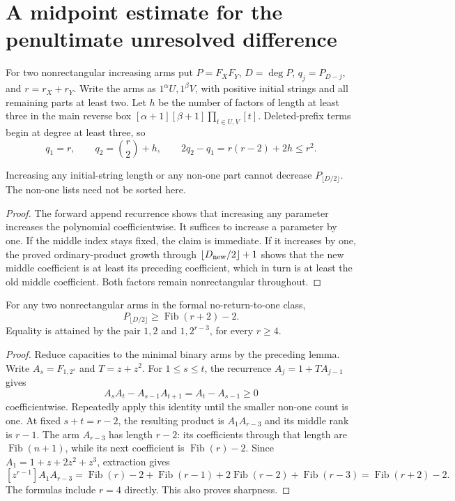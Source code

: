 \section{A midpoint estimate for the penultimate unresolved difference}
For two nonrectangular increasing arms put $P=F_XF_Y$, $D=\deg P$,
$q_j=P_{D-j}$, and $r=r_X+r_Y$. Write the arms as
$1^\alpha U,1^\beta V$, with positive initial strings and all remaining
parts at least two. Let $h$ be the number of factors of length at least
three in the main reverse box
$[\alpha+1][\beta+1]\prod_{t\in U,V}[t]$.
Deleted-prefix terms begin at degree at least three, so
\[
 q_1=r,\qquad q_2=\binom r2+h,
 \qquad 2q_2-q_1=r(r-2)+2h\le r^2.
\]

\begin{lemma}
Increasing any initial-string length or any non-one part cannot decrease
$P_{\lfloor D/2\rfloor}$. The non-one lists need not be sorted here.
\end{lemma}
\begin{proof}
The forward append recurrence shows that increasing any parameter
increases the polynomial coefficientwise. It suffices to increase a
parameter by one. If the middle index stays fixed, the claim is immediate.
If it increases by one, the proved ordinary-product growth through
$\lfloor D_{\rm new}/2\rfloor+1$ shows that the new middle coefficient
is at least its preceding coefficient, which in turn is at least the old
middle coefficient. Both factors remain nonrectangular throughout.
\end{proof}

\begin{theorem}
For any two nonrectangular arms in the formal no-return-to-one class,
\[
           P_{\lfloor D/2\rfloor}\ge \operatorname{Fib}(r+2)-2.
\]
Equality is attained by the pair $1,2$ and $1,2^{r-3}$, for every $r\ge4$.
\end{theorem}
\begin{proof}
Reduce capacities to the minimal binary arms by the preceding lemma.
Write $A_s=F_{1,2^s}$ and $T=z+z^2$. For $1\le s\le t$,
the recurrence $A_j=1+TA_{j-1}$ gives
\[
 A_sA_t-A_{s-1}A_{t+1}=A_t-A_{s-1}\ge0
\]
coefficientwise. Repeatedly apply this identity until the smaller
non-one count is one. At fixed $s+t=r-2$, the resulting product is
$A_1A_{r-3}$ and its middle rank is $r-1$.
The arm $A_{r-3}$ has length $r-2$: its coefficients through that
length are $\operatorname{Fib}(n+1)$, while its next coefficient is
$\operatorname{Fib}(r)-2$. Since $A_1=1+z+2z^2+z^3$, extraction gives
\[
 [z^{r-1}]A_1A_{r-3}
 =\operatorname{Fib}(r)-2+\operatorname{Fib}(r-1)
       +2\operatorname{Fib}(r-2)+\operatorname{Fib}(r-3)
 =\operatorname{Fib}(r+2)-2.
\]
The formulas include $r=4$ directly. This also proves sharpness.
\end{proof}

